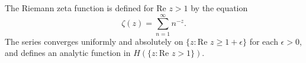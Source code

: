 The Riemann zeta function is defined for $\text{Re } z > 1$ by the equation
$$\zeta(z) = \sum_{n=1}^{\infty} n^{-z}.$$
The series converges uniformly and absolutely on $\{z: \text{Re } z \geq 1 + \epsilon\}$ for each $\epsilon > 0$, and defines an analytic function in $H(\{z: \text{Re } z > 1\})$.
